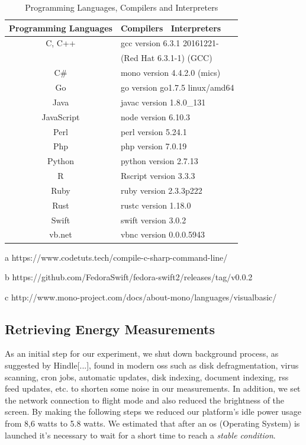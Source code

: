 \begin{table}
	\begin{threeparttable}
	\caption{Programming Languages, Compilers and Interpreters}
	\label{Languages_Compilers_and_Interpreters}
	\begin{tabular}{cl}
		\toprule
		Programming Languages & Compilers \ Interpreters \\
		\midrule
		C, C++	& gcc version 6.3.1 20161221- \\
				& (Red Hat 6.3.1-1) (GCC) \\
		C\#		& mono version 4.4.2.0 (mics)\tnote{a} \\
		Go		& go version go1.7.5 linux/amd64 \\
		Java	& javac version 1.8.0\_131 \\
		JavaScript & node version 6.10.3 \\
		Perl	& perl version 5.24.1 \\
		Php		& php version 7.0.19 \\
		Python	& python version 2.7.13 \\
		R		& Rscript version 3.3.3 \\
		Ruby	& ruby version 2.3.3p222 \\
		Rust	& rustc version 1.18.0 \\
		Swift 	& swift version 3.0.2\tnote{b} \\
		{\sc vb.net} & vbnc version 0.0.0.5943\tnote{c} \\
		\bottomrule
	\end{tabular}
	\begin{tablenotes}
		\begin{small}
			\item[a] {https://www.codetuts.tech/compile-c-sharp-command-line/}
			\item[b] {https://github.com/FedoraSwift/fedora-swift2/releases/tag/v0.0.2}
			\item[c] {http://www.mono-project.com/docs/about-mono/languages/visualbasic/}
		\end{small}
	\end{tablenotes}
	\end{threeparttable}
\end{table}


\subsection{Retrieving Energy Measurements} 
As an initial step for our experiment, we shut down background 
process, as suggested by Hindle[...], found in modern {\sc os}s such as disk 
defragmentation, virus scanning, {\sc cron} jobs, automatic updates, 
disk indexing, document indexing, {\sc rss} feed updates, etc. to 
shorten some noise in our measurements. 
In addition, we set the network connection to flight mode and 
also reduced the brightness of the screen.
By making the following steps we reduced our platform's idle 
power usage from 8,6 watts to 5.8 watts. 
We estimated that after an {\sc os} (Operating System) is launched 
it's necessary to wait for a short time to reach a 
\textit{stable condition}.

